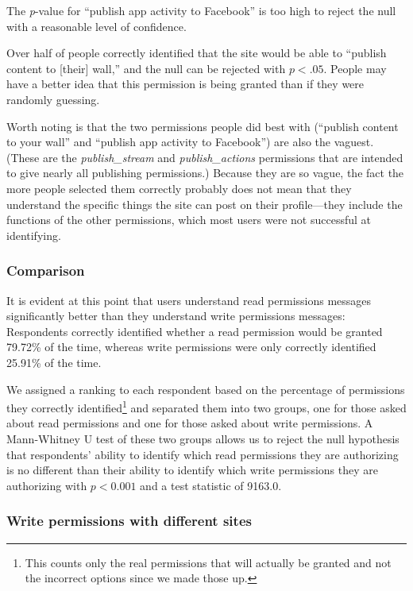 \documentclass[10pt]{sig-alternate-10pt}
\begin{document}
The \emph{p}-value for ``publish app activity to Facebook'' is too high to reject the null with a reasonable level of confidence. 

Over half of people correctly identified that the site would be able to ``publish content to [their] wall,'' and the null can be rejected with $p < .05$. People may have a better idea that this permission is being granted than if they were randomly guessing. 

Worth noting is that the two permissions people did best with (``publish content to your wall'' and ``publish app activity to Facebook'') are also the vaguest. (These are the \emph{publish\_stream} and \emph{publish\_actions} permissions that are intended to give nearly all publishing permissions.) Because they are so vague, the fact the more people selected them correctly probably does not mean that they understand the specific things the site can post on their profile---they include the functions of the other permissions, which most users were not successful at identifying.

\subsubsection{Comparison}

It is evident at this point that users understand read permissions messages significantly better than they understand write permissions messages: Respondents correctly identified whether a read permission would be granted 79.72\% of the time, whereas write permissions were only correctly identified 25.91\% of the time.

We assigned a ranking to each respondent based on the percentage of permissions they correctly identified\footnote{This counts only the real permissions that will actually be granted and not the incorrect options since we made those up.} and separated them into two groups, one for those asked about read permissions and one for those asked about write permissions.  A Mann-Whitney U test of these two groups allows us to reject the null hypothesis that respondents’ ability to identify which read permissions they are authorizing is no different than their ability to identify which write permissions they are authorizing with $p < 0.001$ and a test statistic of 9163.0.

\subsubsection{Write permissions with different sites}
\end{document}
